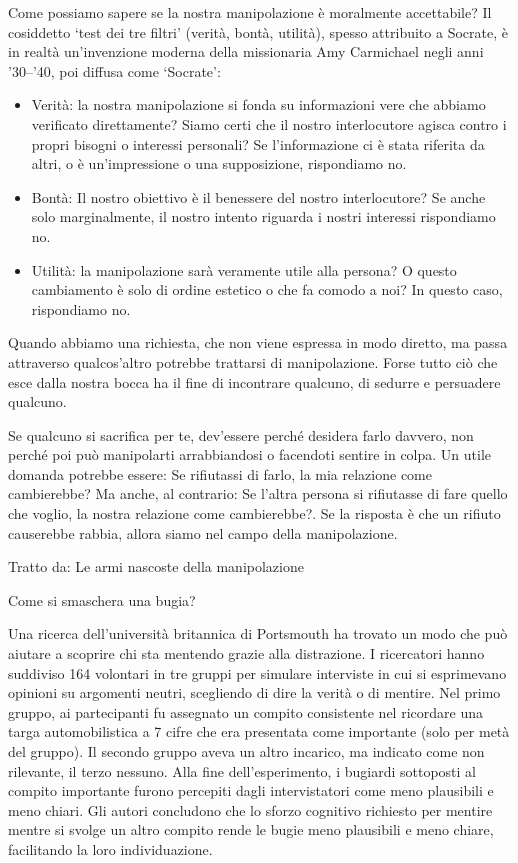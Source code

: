 \documentclass[12pt]{book} %
\begin{document}
Come possiamo sapere se la nostra manipolazione è moralmente accettabile? Il cosiddetto ‘test dei tre filtri’ (verità, bontà, utilità), spesso attribuito a Socrate, è in realtà un’invenzione moderna della missionaria Amy Carmichael negli anni ’30–’40, poi diffusa come ‘Socrate’: 

\begin{itemize}
\item Verità: la nostra manipolazione si fonda su informazioni vere che abbiamo verificato direttamente? Siamo certi che
il nostro interlocutore agisca contro i propri bisogni o interessi personali? Se l'informazione ci
è stata riferita da altri, o è un'impressione o una supposizione, rispondiamo no. 
\item Bontà: Il nostro obiettivo è il benessere del nostro interlocutore? Se anche solo marginalmente, il nostro intento
riguarda i nostri interessi rispondiamo no. 
\item Utilità: la manipolazione sarà veramente utile alla persona? O questo cambiamento è solo di ordine estetico o che
fa comodo a noi? In questo caso, rispondiamo no. 
\end{itemize}

Quando abbiamo una richiesta, che non viene espressa in modo diretto, ma passa attraverso qualcos'altro potrebbe trattarsi di manipolazione. Forse tutto ciò che esce dalla nostra bocca ha il fine di
incontrare qualcuno, di sedurre e persuadere qualcuno.

Se qualcuno si sacrifica per te, dev'essere perché desidera farlo davvero, non perché poi può
manipolarti arrabbiandosi o facendoti sentire in colpa. Un utile domanda potrebbe essere: Se rifiutassi di farlo, la
mia relazione come cambierebbe? Ma anche, al contrario: Se l'altra persona si rifiutasse di fare
quello che voglio, la nostra relazione come cambierebbe?. Se la risposta è che un rifiuto causerebbe rabbia, allora
siamo nel campo della manipolazione.

Tratto da: Le armi nascoste della manipolazione

\begin{mdframed}[linewidth=1pt]
Come si smaschera una bugia?

Una ricerca dell'università britannica di Portsmouth ha trovato un modo che può aiutare a scoprire chi sta mentendo grazie alla distrazione. 
I ricercatori hanno suddiviso 164 volontari in tre gruppi per simulare interviste in cui si
esprimevano opinioni su argomenti neutri, scegliendo di dire la verità o di mentire. Nel primo gruppo, ai partecipanti fu assegnato un compito consistente nel ricordare una targa automobilistica a 7 cifre che era presentata come importante (solo per metà del gruppo). Il secondo gruppo aveva
un altro incarico, ma indicato come non rilevante, il terzo nessuno. Alla fine dell’esperimento, i bugiardi sottoposti al compito importante furono percepiti dagli intervistatori come meno plausibili e meno chiari. Gli autori concludono che lo sforzo cognitivo richiesto per mentire mentre si svolge un altro compito rende le bugie meno plausibili e meno chiare, facilitando la loro individuazione.
\end{mdframed}
\end{document}
